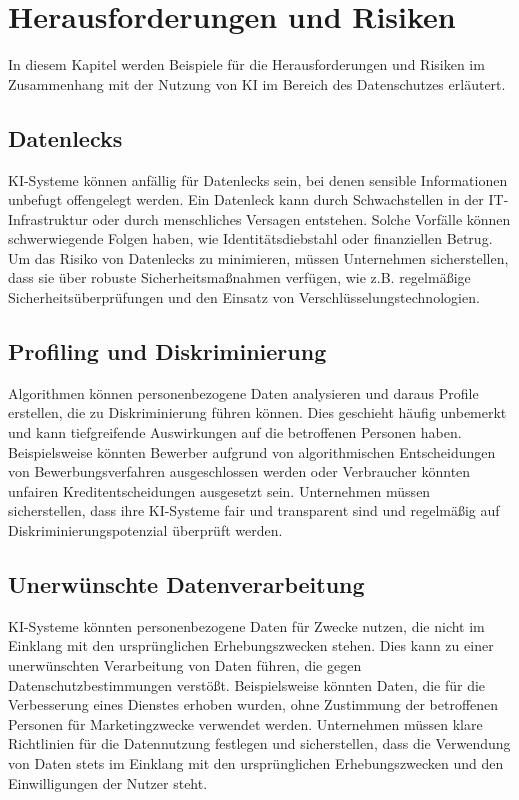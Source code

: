 \chapter{Herausforderungen und Risiken}

In diesem Kapitel werden Beispiele für die Herausforderungen und Risiken im Zusammenhang mit
der Nutzung von KI im Bereich des Datenschutzes erläutert. 


\section{Datenlecks}

KI-Systeme können anfällig für Datenlecks sein, bei denen sensible Informationen
unbefugt offengelegt werden. Ein Datenleck kann durch Schwachstellen in der
IT-Infrastruktur oder durch menschliches Versagen entstehen. Solche Vorfälle
können schwerwiegende Folgen haben, wie Identitätsdiebstahl oder finanziellen
Betrug. Um das Risiko von Datenlecks zu minimieren, müssen Unternehmen
sicherstellen, dass sie über robuste Sicherheitsmaßnahmen verfügen, wie z.B.
regelmäßige Sicherheitsüberprüfungen und den Einsatz von
Verschlüsselungstechnologien.

\section{Profiling und Diskriminierung}

Algorithmen können personenbezogene Daten analysieren und daraus Profile
erstellen, die zu Diskriminierung führen können. Dies geschieht häufig unbemerkt
und kann tiefgreifende Auswirkungen auf die betroffenen Personen haben.
Beispielsweise könnten Bewerber aufgrund von algorithmischen Entscheidungen von
Bewerbungsverfahren ausgeschlossen werden oder Verbraucher könnten unfairen
Kreditentscheidungen ausgesetzt sein. Unternehmen müssen sicherstellen, dass
ihre KI-Systeme fair und transparent sind und regelmäßig auf
Diskriminierungspotenzial überprüft werden.

\section{Unerwünschte Datenverarbeitung}

KI-Systeme könnten personenbezogene Daten für Zwecke nutzen, die nicht im
Einklang mit den ursprünglichen Erhebungszwecken stehen. Dies kann zu einer
unerwünschten Verarbeitung von Daten führen, die gegen Datenschutzbestimmungen
verstößt. Beispielsweise könnten Daten, die für die Verbesserung eines Dienstes
erhoben wurden, ohne Zustimmung der betroffenen Personen für Marketingzwecke
verwendet werden. Unternehmen müssen klare Richtlinien für die Datennutzung
festlegen und sicherstellen, dass die Verwendung von Daten stets im Einklang mit
den ursprünglichen Erhebungszwecken und den Einwilligungen der Nutzer steht.
